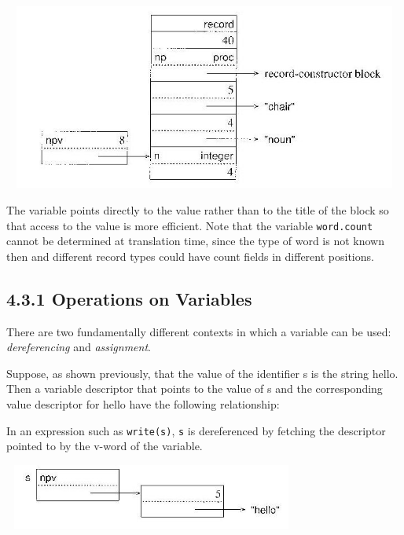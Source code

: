 \begin{center}
\includegraphics[width=5.2492in,height=2.4098in]{ib-img/ib-img014.jpg}
\end{center}

The variable points directly to the value rather than to the title of
the block so that access to the value is more efficient. Note that the
variable \texttt{word.count} cannot be determined at translation time,
since the type of word is not known then and different record types
could have count fields in different positions.

\subsection[4.3.1 Operations on Variables]{4.3.1 Operations on Variables}

There are two fundamentally different contexts in which a variable can
be used: \textit{dereferencing} and \textit{assignment}.

Suppose, as shown previously, that the value of the identifier s is
the string {\textquotedbl}hello{\textquotedbl}. Then a variable
descriptor that points to the value of s and the corresponding value
descriptor for {\textquotedbl}hello{\textquotedbl} have the following
relationship:

In an expression such as \texttt{write(s)}, \texttt{s} is dereferenced
by fetching the descriptor pointed to by the v-word of the variable.

\begin{center}
\includegraphics[width=3.8492in,height=0.8492in]{ib-img/ib-img015.jpg}
\end{center}

